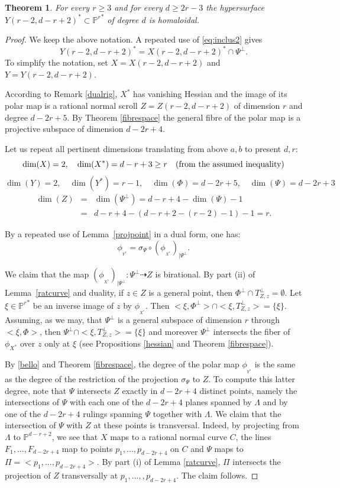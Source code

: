 \documentclass[11pt]{article}   %
\newtheorem{Theorem}{Theorem}
\theoremstyle{definition}
\numberwithin{Theorem}{section} \numberwithin{equation}{section}
\newcommand{\p}{{\mathbb P}}
\newcommand{\map}{\dasharrow}
\begin{document}
{\begin{Theorem}\label{serie} For every $r\geq 3$ and for every $d\geq
2r-3$ the hypersurface $Y(r-2,d-r+2)^ *\subset {\p^r}^*$ of degree
$d$ is homaloidal.
\end{Theorem}

\begin{proof} We keep the above notation.
A repeated use of  \eqref  {eq:inclus2} gives
 $$Y(r-2,d-r+2)^ *= X(r-2,d-r+2)^*\cap \Psi^ \perp.$$ To
simplify the notation, set $X=X(r-2,d-r+2)$ and $Y=Y(r-2,d-r+2)$.

According to Remark \ref{dualrig}, $X^ *$ has vanishing Hessian and
the image of its polar map is a rational normal scroll
$Z=Z(r-2,d-r+2)$ of dimension  $r$ and degree $d-2r+5$. By Theorem
\ref {fibrespace} the general fibre of the polar map is a projective
subspace of dimension    $d-2r+4$.

Let us
repeat all pertinent dimensions translating from above $a,b$ to
present $d,r$:
$$\dim (X)=2,\quad \dim (X^*)=d-r+3\geq r \quad \mbox{\rm (from the
assumed inequality)} $$
$$\dim (Y)=2, \quad \dim (Y^*)=r-1, \quad \dim(\Phi)=d-2r+5,  \quad \dim (\Psi)=d-2r+3$$
\begin{eqnarray*}\dim (Z)&=&\dim (\Psi^\perp)=d-r+4-\dim (\Psi) -1\\
&=&d-r+4-(d-r+2-(r-2)-1)-1=r.
\end{eqnarray*}

By a repeated use of Lemma~\ref{projpoint} in a dual form, one has:
\begin{equation}\label{bello}\phi_{_{Y^*}}=\sigma_\Psi\circ
(\phi_{_{X^*}})_{|\Psi^\perp}.\end{equation}

We claim that the map $(\phi_{_{X^*}})_{|\Psi^\perp}:\Psi^ \perp\map
Z$ is birational. By part (ii) of Lemma~\ref{ratcurve} and duality,
if $z\in Z$ is a general point, then $\Phi^ \perp\cap T_{Z,z}^
\perp=\emptyset$. Let $\xi\in {\p^r}^*$ be an inverse image of $z$
by $\phi_{_{X^*}}$. Then
$<\xi,\Phi^ \perp>\cap<\xi,T_{Z,z}^\perp>=\{\xi\}$. Assuming, as we may,
that $\Psi^ \perp$ is a general subspace of dimension $r$ through
$<\xi,\Phi>$, then $\Psi^ \perp\cap <\xi,T_{Z,z}^\perp>=\{\xi\}$ and
moreover $\Psi^\perp$ intersects the fiber of $\phi_{X^*}$ over $z$
only at $\xi$ (see Propositions \ref{hessian} and Theorem \ref {fibrespace}).

By \eqref{bello} and Theorem \ref {fibrespace},
 the degree of the polar map $\phi_{_{Y^*}}$ is the
same as the degree of the restriction of the projection
$\sigma_\Psi$ to $Z$. To compute this latter degree, note that
$\Psi$ intersects $Z$ exactly in $d-2r+4$ distinct points, namely
the intersections of $\Psi$ with each one of the $d-2r+4$ planes
spanned by $\Lambda$ and by one of the $d-2r+4$ rulings spanning
$\Psi$ together with $\Lambda$. We claim that the intersection of
$\Psi$ with $Z$ at these points is transversal. Indeed, by
projecting from $\Lambda$ to $\p^ {d-r+2}$, we see that $X$ maps to
a rational normal curve $C$, the lines $F_1,...,F_{d-2r+4}$ map to
points $p_1,...,p_{d-2r+4}$ on $C$ and $\Psi$ maps to
$\Pi=<p_1,...,p_{d-2r+4}>$. By part (i) of Lemma \ref{ratcurve},
$\Pi$ intersects the projection of $Z$ transversally at
$p_1,...,,p_{d-2r+4}$. The claim follows.


\end{proof}}
\end{document}
